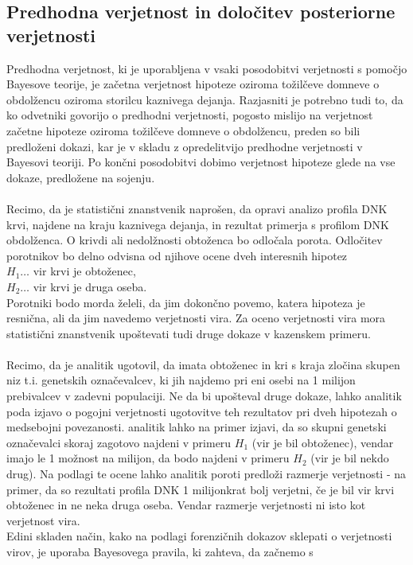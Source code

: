\documentclass[12pt,a4paper]{amsart}
\theoremstyle{definition} %
\theoremstyle{plain} %
\begin{document}
\subsection{Predhodna verjetnost in določitev posteriorne verjetnosti}
Predhodna verjetnost, ki je uporabljena v vsaki posodobitvi verjetnosti s pomočjo Bayesove teorije, je začetna verjetnost hipoteze oziroma tožilčeve domneve 
o obdolžencu oziroma storilcu kaznivega dejanja. Razjasniti je potrebno tudi to, da ko odvetniki govorijo o predhodni verjetnosti, pogosto mislijo na verjetnost 
začetne hipoteze oziroma tožilčeve domneve o obdolžencu, preden so bili predloženi dokazi, kar je v skladu z opredelitvijo predhodne verjetnosti v Bayesovi 
teoriji. Po končni posodobitvi dobimo verjetnost hipoteze glede na vse dokaze, predložene na sojenju.\\\\
Recimo, da je statistični znanstvenik naprošen, da opravi analizo profila DNK krvi, najdene na kraju kaznivega dejanja, in rezultat primerja s profilom DNK
obdolženca. O krivdi ali nedolžnosti obtoženca bo odločala porota. Odločitev porotnikov bo delno odvisna od njihove ocene dveh interesnih
hipotez\\
$H_1 \dots$ vir krvi je obtoženec,\\
$H_2 \dots$ vir krvi je druga oseba.\\
Porotniki bodo morda želeli, da jim dokončno povemo, katera hipoteza je resnična, ali da jim navedemo verjetnosti vira. Za oceno verjetnosti 
vira mora statistični znanstvenik upoštevati tudi druge dokaze v kazenskem primeru.\\\\
Recimo, da je analitik ugotovil, da imata obtoženec in kri s kraja zločina skupen niz t.i. genetskih označevalcev, ki jih najdemo pri eni osebi
na 1 milijon prebivalcev v zadevni populaciji. Ne da bi upošteval druge dokaze, lahko analitik poda izjavo o pogojni verjetnosti
ugotovitve teh rezultatov pri dveh hipotezah o medsebojni povezanosti. analitik lahko na primer izjavi, da so skupni genetski označevalci
skoraj zagotovo najdeni v primeru $H_1$ (vir je bil obtoženec), vendar imajo le 1 možnost na milijon, da bodo najdeni v primeru $H_2$ (vir je bil
nekdo drug). Na podlagi te ocene lahko analitik poroti predloži razmerje verjetnosti - na primer, da so rezultati profila DNK 1 milijonkrat
bolj verjetni, če je bil vir krvi obtoženec in ne neka druga oseba. Vendar razmerje verjetnosti ni isto kot verjetnost vira. \\
Edini skladen način, kako na podlagi forenzičnih dokazov sklepati o verjetnosti virov, je uporaba Bayesovega pravila, ki zahteva, da začnemo s
\end{document}
